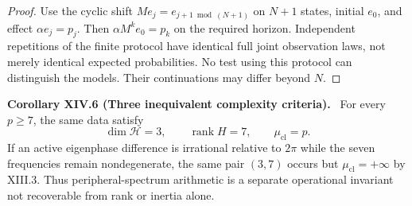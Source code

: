 \documentclass[11pt,a4paper,oneside]{book}
\DeclareMathOperator{\rank}{rank}\DeclareMathOperator{\Tr}{Tr}
\newcommand{\statement}[3]{\par\medskip\noindent\textbf{#1 #2 (#3).}\ }
\begin{document}
\begin{proof}Use the cyclic shift $Me_j=e_{j+1\bmod(N+1)}$ on $N+1$ states, initial $e_0$, and effect $\alpha e_j=p_j$. Then $\alpha M^ke_0=p_k$ on the required horizon. Independent repetitions of the finite protocol have identical full joint observation laws, not merely identical expected probabilities. No test using this protocol can distinguish the models. Their continuations may differ beyond $N$.\end{proof}
\statement{Corollary}{XIV.6}{Three inequivalent complexity criteria} For every $p\ge7$, the same data satisfy
\[\dim\mathcal H=3,\qquad\rank H=7,\qquad\mu_{\mathrm{cl}}=p.\]
If an active eigenphase difference is irrational relative to $2\pi$ while the seven frequencies remain nondegenerate, the same pair $(3,7)$ occurs but $\mu_{\mathrm{cl}}=+\infty$ by XIII.3. Thus peripheral-spectrum arithmetic is a separate operational invariant not recoverable from rank or inertia alone.
\end{document}
